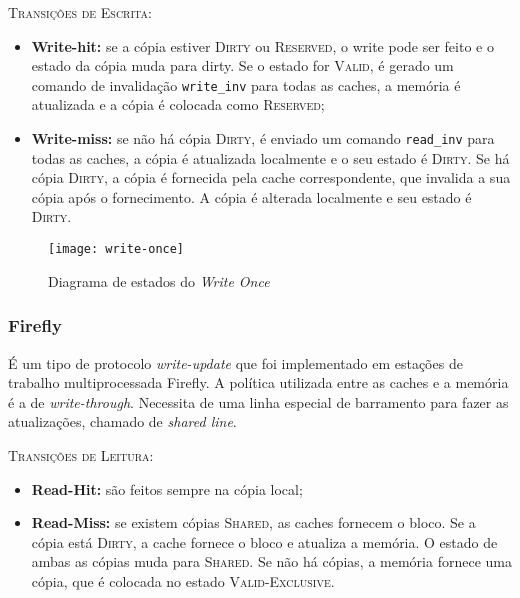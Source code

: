 \textsc{Transições de Escrita:}
\begin{itemize}
  \item \textbf{Write-hit:} se a cópia estiver \textsc{Dirty} ou \textsc{Reserved}, o write pode ser feito e o estado da cópia muda para dirty. Se o estado for \textsc{Valid}, é gerado um comando de invalidação \texttt{write\_inv} para todas as caches, a memória é atualizada e a cópia é colocada como \textsc{Reserved};

  \item \textbf{Write-miss:} se não há cópia \textsc{Dirty}, é enviado um comando \texttt{read\_inv} para todas as caches, a cópia é atualizada localmente e o seu estado é \textsc{Dirty}. Se há cópia \textsc{Dirty}, a cópia é fornecida pela cache correspondente, que invalida a sua cópia após o fornecimento. A cópia é alterada localmente e seu estado é \textsc{Dirty}.
\end{itemize}

\begin{figure}[ht]
  \centering
  \texttt{[image: write-once]}
  \label{fig:writeonce-automata}
  \caption{Diagrama de estados do \textit{Write Once}}
\end{figure}






\subsubsection{Firefly}
É um tipo de protocolo \textit{write-update} que foi implementado em estações de trabalho multiprocessada Firefly. A política utilizada entre as caches e a memória é a de \textit{write-through}. Necessita de uma linha especial de barramento para fazer as atualizações, chamado de \textit{shared line}.

\textsc{Transições de Leitura:}
\begin{itemize}
  \item \textbf{Read-Hit:} são feitos sempre na cópia local;

  \item \textbf{Read-Miss:} se existem cópias \textsc{Shared}, as caches fornecem o bloco. Se a cópia está \textsc{Dirty}, a cache fornece o bloco e atualiza a memória. O estado de ambas as cópias muda para \textsc{Shared}. Se não há cópias, a memória fornece uma cópia, que é colocada no estado \textsc{Valid-Exclusive}.
\end{itemize}

